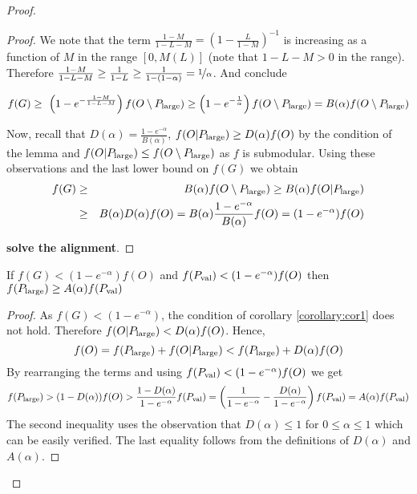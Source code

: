 \begin{proof}
\begin{proof}
  	We note that the term $\frac{1-M}{1-L-M} = \left(  1- \frac{L}{1-M} \right)^{-1}$ is increasing as a function
  	of $M$  in the range $[0, M(L)]$ (note that $1-L-M >0$ in the range).
  	Therefore $\frac{1-M}{1-L-M} \geq  \frac{1 }{1-L}  \geq \frac{1}{1-(1-\alpha)} = \nicefrac[]{1}{\alpha}$. And conclude
  		
  	  $$f(G)
  	\geq \ \left(1-e^{- \frac{1-M }{1-L-M}}\right) f(O\setminus P_{\text{large}}) \geq \left( 1- e ^ {- \frac{1}{ \alpha}} \right)f(O\setminus P_{\text{large}}) 
  	= B(\alpha)f(O\setminus P_{\text{large}}) $$
  	
  	Now, recall that $D(\alpha)= \frac{1-e^{-\alpha}}{B(\alpha)}$, 
	$f(O|P_{\text{large}}) \geq D(\alpha) f(O)$ by the condition of the 
	lemma and $f(O|P_{\text{large}}) \leq f(O\setminus P_{\text{large}})$ as
	$f$ is submodular. Using these observations and the last lower 
	bound on $f(G)$ we obtain
\begin{align*}
f(G) &\geq& B(\alpha)f(O\setminus P_{\text{large}})  \geq
B(\alpha) f(O|P_{\text{large}})\\ & \geq& 
B(\alpha ) D(\alpha ) f(O)
= B(\alpha)\frac{1-e^{-\alpha}}{B(\alpha) }f(O)= (1-e^{-\alpha})f(O)
\end{align*}

	{\bf solve the alignment}.
	\end{proof}

	\begin{corollary}
		\label{corollary:cor2}
		If $f(G)< (1-e^{-\alpha})f(O)$ and $f(P_{\text{val}}) < (1-e^{-\alpha})f(O)$ then
		$f(P_{\text{large}}) \geq A(\alpha) f(P_{\text{val}})$ 
		\end{corollary}
	\begin{proof}
		As $f(G)< (1-e^{-\alpha})$, the condition of corollary \ref{corollary:cor1} does not hold. Therefore
		$f(O|P_{\text{large}})< D(\alpha) f(O)$. Hence, 
		$$f(O)= f(P_{\text{large}}) + f(O|P_{\text{large}}) < f(P_{\text{large}}) + D(\alpha) f(O)$$ 
		By rearranging the terms and using $f(P_{\text{val}}) < (1-e^{-\alpha})f(O)$ 
		we get 
		$$f(P_{\text{large}}) > (1-D(\alpha)) f(O) > \frac{1-D(\alpha)}{1-e^{-\alpha}} f(P_{\text{val}}) 
		= \left(\frac{1}{1-e^{-\alpha}} - \frac{D(\alpha)}{1-e^{-\alpha}}\right) f(P_{\text{val}}) = A(\alpha) f(P_{\text{val}})$$
		The second inequality uses the observation that $D(\alpha) \leq 1$ for $0\leq \alpha \leq 1$ which can be easily verified. The last equality follows from the definitions
		of $D(\alpha)$ and $A(\alpha)$. 
		

\end{proof}
\end{proof}
